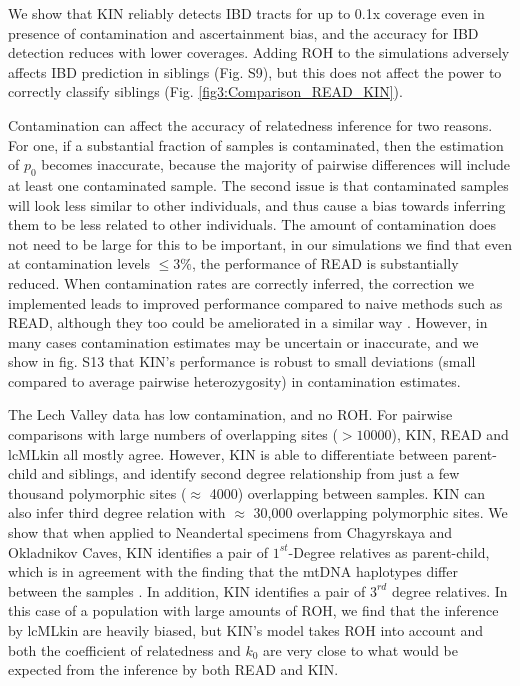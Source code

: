 \documentclass[12pt, letterpaper]{article}
\begin{document}
We show that KIN reliably detects IBD tracts for up to 0.1x coverage even in presence of contamination and ascertainment bias, and the accuracy for IBD detection reduces with lower coverages. Adding ROH to the simulations adversely affects IBD prediction in siblings (Fig. S9), but this does not affect the power to correctly classify siblings (Fig. \ref{fig3:Comparison_READ_KIN}).

Contamination can affect the accuracy of relatedness inference for two reasons. For one, if a substantial fraction of samples is contaminated, then the estimation of $p_0$ becomes inaccurate, because the majority of pairwise differences will include at least one contaminated sample. The second issue is that contaminated samples will look less similar to other individuals, and thus cause a bias towards inferring them to be less related to other individuals. The amount of contamination does not need to be large for this to be important, in our simulations we find that even at contamination levels $\leq 3\%$, the performance of READ is substantially reduced. When contamination rates are correctly inferred, the correction we implemented leads to improved performance compared to naive methods such as READ, although they too could be ameliorated in a similar way \cite{laurits_skov_genetic_nodate}. However, in many cases contamination estimates may be uncertain or inaccurate, and we show in fig. S13 that KIN's performance is robust to small deviations (small compared to average pairwise heterozygosity) in contamination estimates.

The Lech Valley data has low contamination, and no ROH. For pairwise comparisons with large numbers of overlapping sites ($>10000$), KIN, READ and lcMLkin all mostly agree. However, KIN is able to differentiate between parent-child and siblings, and identify second degree relationship from just a few thousand polymorphic sites ($\approx$ 4000) overlapping between samples. KIN can also infer third degree relation with $\approx$ 30,000 overlapping polymorphic sites. We show that when applied to Neandertal specimens from Chagyrskaya and Okladnikov Caves, KIN identifies a pair of $1^{st}$-Degree relatives as parent-child, which is in agreement with the finding that the mtDNA haplotypes differ between the samples \cite{laurits_skov_genetic_nodate}. In addition, KIN identifies a pair of $3^{rd}$ degree relatives. In this case of a population with large amounts of ROH, we find that the inference by lcMLkin are heavily biased, but KIN's model takes ROH into account and both the coefficient of relatedness and $k_0$ are very close to what would be expected from the inference by both READ and KIN. 
\end{document}
